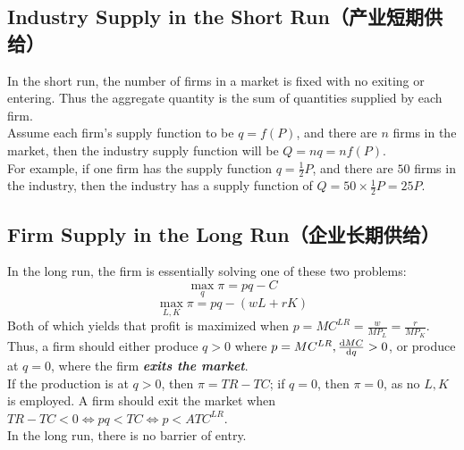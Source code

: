 \subsection{Industry Supply in the Short Run（产业短期供给）}
In the short run, the number of firms in a market is fixed with no exiting or entering. Thus the aggregate quantity is the sum of quantities supplied by each firm. \\
Assume each firm's supply function to be $q = f(P)$, and there are $n$ firms in the market, then the industry supply function will be $Q = nq = nf(P)$. \\
For example, if one firm has the supply function $q = \frac{1}{2}P$, and there are $50$ firms in the industry, then the industry has a supply function of $Q = 50 \times \frac{1}{2}P = 25 P$.

\subsection{Firm Supply in the Long Run（企业长期供给）}
In the long run, the firm is essentially solving one of these two problems:
$$\max_q \pi = pq - C$$
$$\max_{L, K} \pi = pq - (wL + rK)$$
Both of which yields that profit is maximized when $p = MC^{LR} = \frac{w}{MP_L} = \frac{r}{MP_K}$. \\
Thus, a firm should either produce $q > 0$ where $p = MC^{LR}, \dv{MC}{q} > 0$, or produce at $q = 0$, where the firm \textbf{\textit{exits the market}}. \\
If the production is at $q > 0$, then $\pi = TR - TC$; if $q = 0$, then $\pi = 0$, as no $L, K$ is employed. A firm should exit the market when $TR - TC < 0 \iff pq < TC \iff p < ATC^{LR}$. \\
In the long run, there is no barrier of entry.

